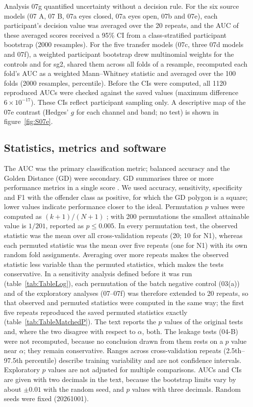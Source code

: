 Analysis 07g quantified uncertainty without a decision rule. For the six source models (07 A, 07 B, 07a eyes closed, 07a eyes open, 07b and 07e), each participant's decision value was averaged over the 20 repeats, and the AUC of these averaged scores received a 95\% CI from a class-stratified participant bootstrap (2000 resamples). For the five transfer models (07c, three 07d models and 07f), a weighted participant bootstrap drew multinomial weights for the controls and for sg2, shared them across all folds of a resample, recomputed each fold's AUC as a weighted Mann--Whitney statistic and averaged over the 100 folds (2000 resamples, percentile). Before the CIs were computed, all 1120 reproduced AUCs were checked against the saved values (maximum difference $6 \times 10^{-17}$). These CIs reflect participant sampling only. A descriptive map of the 07e contrast (Hedges' $g$ for each channel and band; no test) is shown in figure~\ref{fig:S07e}.

\subsection{Statistics, metrics and software}
\label{sec:stats}

The AUC was the primary classification metric; balanced accuracy and the Golden Distance (GD) were secondary. GD summarises three or more performance metrics in a single score \cite{Melek2025GD}. We used accuracy, sensitivity, specificity and F1 with the offender class as positive, for which the GD polygon is a square; lower values indicate performance closer to the ideal. Permutation $p$ values were computed as $(k+1)/(N+1)$ \cite{Ojala2010}; with 200 permutations the smallest attainable value is $1/201$, reported as $p \le 0.005$. In every permutation test, the observed statistic was the mean over all cross-validation repeats (20; 10 for N1), whereas each permuted statistic was the mean over five repeats (one for N1) with its own random fold assignments. Averaging over more repeats makes the observed statistic less variable than the permuted statistics, which makes the tests conservative. In a sensitivity analysis defined before it was run (table~\ref{tab:TableLog}), each permutation of the batch negative control (03(a)) and of the exploratory analyses (07--07f) was therefore extended to 20 repeats, so that observed and permuted statistics were computed in the same way; the first five repeats reproduced the saved permuted statistics exactly (table~\ref{tab:TableMatchedP}). The text reports the $p$ values of the original tests and, where the two disagree with respect to $\alpha$, both. The leakage tests (04-B) were not recomputed, because no conclusion drawn from them rests on a $p$ value near $\alpha$; they remain conservative. Ranges across cross-validation repeats (2.5th--97.5th percentile) describe training variability and are not confidence intervals. Exploratory $p$ values are not adjusted for multiple comparisons. AUCs and CIs are given with two decimals in the text, because the bootstrap limits vary by about $\pm 0.01$ with the random seed, and $p$ values with three decimals. Random seeds were fixed (20261001).

